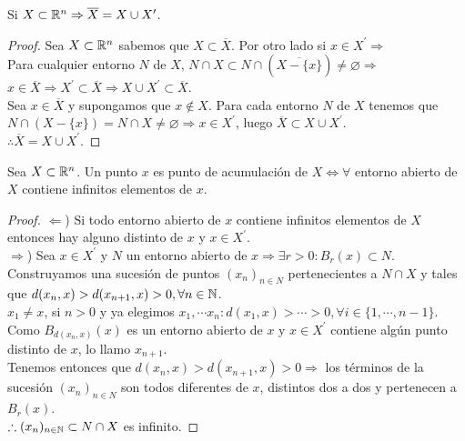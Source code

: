 \begin{prop}
  Si $X \subset \mathbb{R}^n \Rightarrow \overline{X} = X \cup X^{\prime}$.
  \begin{proof}
    Sea $X \subset \mathbb{R}^n$ sabemos que $X \subset \overline{X}$. Por otro lado si $x \in X^{\prime} \Rightarrow$ \\
    Para cualquier entorno $N$ de $X$, $N \cap X \subset N \cap (\overline{X - \{x\}}) \neq \varnothing \Rightarrow$ \\
    $x \in \overline{X} \Rightarrow X^{\prime} \subset \overline{X} \Rightarrow X \cup X^{\prime} \subset \overline{X}$. \\

    Sea $x \in \overline{X}$ y supongamos que $x \notin X$. Para cada entorno $N$ de $X$ tenemos que $N \cap (X - \{x\}) = N \cap X \neq \varnothing \Rightarrow x \in X^{\prime}$, luego $\overline{X} \subset X \cup X^{\prime}$. \\
    $\therefore \overline{X} = X \cup X^{\prime}$.
  \end{proof}
\end{prop}

\clearpage

\begin{prop}
  Sea $X \subset \mathbb{R}^n$. Un punto $x$ es punto de acumulación de $X \iff \forall$ entorno abierto de $X$ contiene infinitos elementos de $x$.

  \begin{proof}
    $\Leftarrow$) Si todo entorno abierto de $x$ contiene infinitos elementos de $X$ entonces hay alguno distinto de $x$ y $x \in X^{\prime}$. \\
    $\Rightarrow$) Sea $x \in X^{\prime}$ y $N$ un entorno abierto de $x \Rightarrow \exists r > 0 : B_r(x) \subset N$. \\
    Construyamos una sucesión de puntos $(x_n)_{n \in N}$ pertenecientes a $N \cap X$ y tales que $d(x_n, x) > d(x_{n+1}, x) > 0, \forall n \in \mathbb{N}$. \\
    $x_1 \neq x$, si $n > 0$ y ya elegimos $x_1, \cdots x_n : d(x_1, x) > \cdots > 0, \forall i \in \{1, \cdots, n-1\}$. Como $B_{d(x_n, x)}(x)$ es un entorno abierto de $x$ y $x \in X^{\prime}$ contiene algún punto distinto de $x$, lo llamo $x_{n+1}$. \\
    Tenemos entonces que $d(x_n, x) > d(x_{n+1}, x) > 0 \Rightarrow$ los términos de la sucesión $(x_n)_{n \in N}$ son todos diferentes de $x$, distintos dos a dos y pertenecen a $B_r(x)$. \\
    $\therefore (x_n)_{n \in \mathbb{N}} \subset N \cap X$ es infinito.
  \end{proof}
\end{prop}

